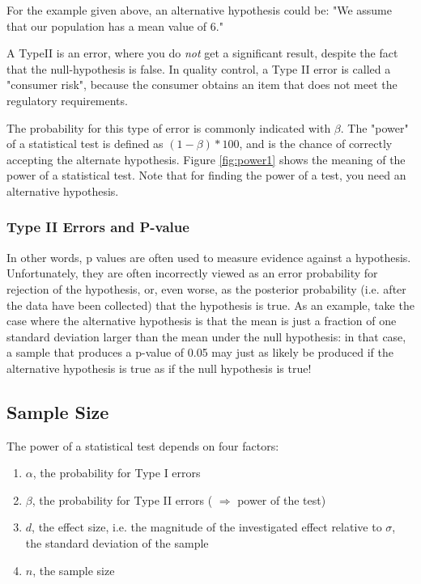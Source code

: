 For the example given above, an alternative hypothesis could be: "We assume that our population has a mean value of 6."

A \gls{TypeII} is an error, where you do \emph{not} get a significant result, despite the fact that the null-hypothesis is false.  In quality control, a Type II error is called a "consumer risk", because the consumer obtains an item that does not meet the regulatory requirements.

The probability for this type of error is commonly indicated with $\beta$. The "power" of a statistical test is defined as $(1-\beta)*100$, and is the chance of correctly accepting the alternate hypothesis. Figure \ref{fig:power1} shows the meaning of the power of a statistical test. Note that for finding the power of a test, you need an alternative hypothesis.

\subsubsection{Type II Errors and P-value}

In other words, p values are often used to measure evidence against a hypothesis. Unfortunately, they are often incorrectly viewed as an error probability for rejection of the hypothesis, or, even worse, as the posterior probability (i.e. after the data have been collected) that the hypothesis is true. As an example, take the case where the alternative hypothesis is that the mean is just a fraction of one standard deviation larger than the mean under the null hypothesis: in that case, a sample that produces a p-value of 0.05 may just as likely be produced if the alternative hypothesis is true as if the null hypothesis is true!

\subsection{Sample Size}
The power of a statistical test depends on four factors:

\begin{enumerate}
  \item  $\alpha$, the probability for Type I errors
  \item  $\beta$, the probability for Type II errors ( $\Rightarrow$ power of the test)
  \item  $d$, the effect size, i.e. the magnitude of the investigated effect relative to $\sigma$, the standard deviation of the sample
  \item  $n$, the sample size
\end{enumerate}

